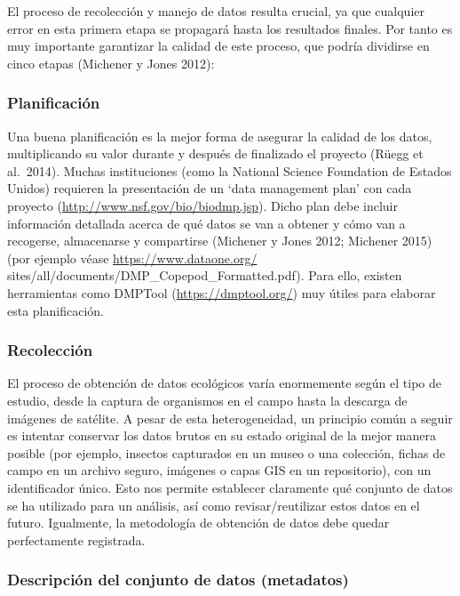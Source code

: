 \documentclass[]{tufte-handout}
\begin{document}
El proceso de recolección y manejo de datos resulta crucial, ya que
cualquier error en esta primera etapa se propagará hasta los resultados
finales. Por tanto es muy importante garantizar la calidad de este
proceso, que podría dividirse en cinco etapas (Michener y Jones 2012):

\hypertarget{planificaciuxf3n}{%
\subsubsection{Planificación}\label{planificaciuxf3n}}

Una buena planificación es la mejor forma de asegurar la calidad de los
datos, multiplicando su valor durante y después de finalizado el
proyecto (Rüegg et al.~2014). Muchas instituciones (como la National
Science Foundation de Estados Unidos) requieren la presentación de un
`data management plan' con cada proyecto
(\url{http://www.nsf.gov/bio/biodmp.jsp}). Dicho plan debe incluir
información detallada acerca de qué datos se van a obtener y cómo van a
recogerse, almacenarse y compartirse (Michener y Jones 2012; Michener
2015) (por ejemplo véase \url{https://www.dataone.org/}
sites/all/documents/DMP\_Copepod\_Formatted.pdf). Para ello, existen
herramientas como DMPTool (\url{https://dmptool.org/}) muy útiles para
elaborar esta planificación.

\hypertarget{recolecciuxf3n}{%
\subsubsection{Recolección}\label{recolecciuxf3n}}

El proceso de obtención de datos ecológicos varía enormemente según el
tipo de estudio, desde la captura de organismos en el campo hasta la
descarga de imágenes de satélite. A pesar de esta heterogeneidad, un
principio común a seguir es intentar conservar los datos brutos en su
estado original de la mejor manera posible (por ejemplo, insectos
capturados en un museo o una colección, fichas de campo en un archivo
seguro, imágenes o capas GIS en un repositorio), con un identificador
único. Esto nos permite establecer claramente qué conjunto de datos se
ha utilizado para un análisis, así como revisar/reutilizar estos datos
en el futuro. Igualmente, la metodología de obtención de datos debe
quedar perfectamente registrada.

\hypertarget{descripciuxf3n-del-conjunto-de-datos-metadatos}{%
\subsubsection{Descripción del conjunto de datos
(metadatos)}\label{descripciuxf3n-del-conjunto-de-datos-metadatos}}
\end{document}

